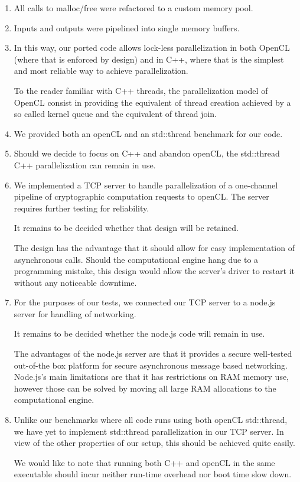 \documentclass{article}
\begin{document}
\begin{enumerate}
\item All calls to malloc/free were refactored to a custom memory pool. 
\item Inputs and outputs were pipelined into single memory buffers. 
\item In this way, our ported code allows lock-less parallelization in both OpenCL (where that is enforced by design) and in C++, where that is the simplest and most reliable way to achieve parallelization. 

To the reader familiar with C++ threads, the parallelization model of OpenCL consist in providing the equivalent of thread creation achieved by a so called kernel queue and the equivalent of thread join.

\item We provided both an openCL and an std::thread benchmark for our code.

\item Should we decide to focus on C++ and abandon openCL, the std::thread C++ parallelization can remain in use. 

\item We implemented a TCP server to handle parallelization of a one-channel pipeline of cryptographic computation requests to openCL. The server requires further testing for reliability.  

It remains to be decided whether that design will be retained. 

The design has the advantage that it should allow for easy implementation of asynchronous calls. Should the computational engine hang due to a programming mistake, this design would allow the server's driver to restart it without any noticeable downtime.

\item For the purposes of our tests, we connected our TCP server to a node.js server for handling of networking. 

It remains to be decided whether the node.js code will remain in use. 

The advantages of the node.js server are that it provides a secure well-tested out-of-the box platform for secure asynchronous message based networking. Node.js's main limitations are that it has restrictions on RAM memory use, however those can be solved by moving all large RAM allocations to the computational engine.

\item Unlike our benchmarks where all code runs using both openCL std::thread, we have yet to implement std::thread parallelization in our TCP server. In view of the other properties of our setup, this should be achieved quite easily. 

We would like to note that running both C++ and openCL in the same executable should incur neither run-time overhead nor boot time slow down.


 
\end{enumerate}
\end{document}
